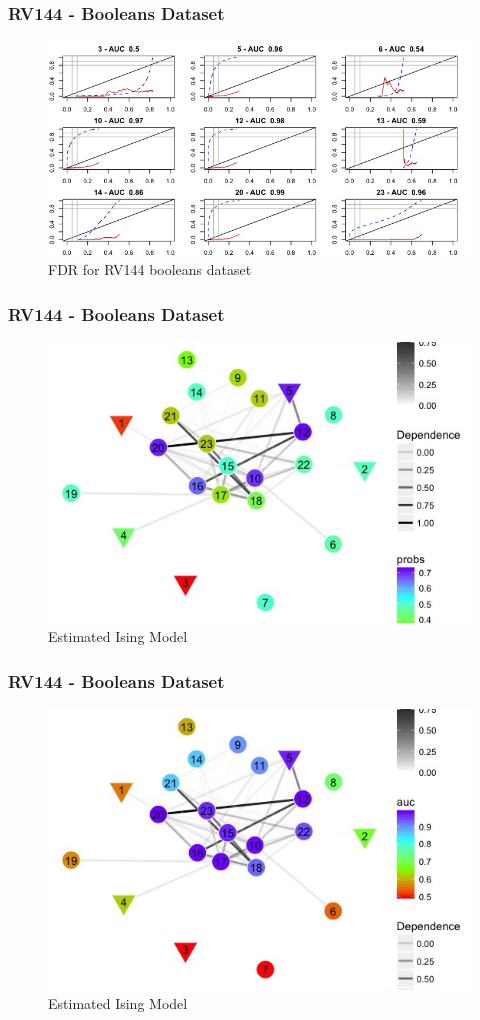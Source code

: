 \documentclass{beamer}
\theoremstyle{definition}
\begin{document}

\begin{frame}
\frametitle{RV144 - Booleans Dataset}
\begin{figure}[]
\includegraphics[width=12 cm]{figures/boolFDR} \caption{FDR for RV144 booleans dataset}
\end{figure}
\end{frame}


\begin{frame}
\frametitle{RV144 - Booleans Dataset}
\begin{figure}[]
\includegraphics[width=10 cm]{figures/boolNetworkProbs} \caption{Estimated Ising Model}
\end{figure}
\end{frame}


\begin{frame}
\frametitle{RV144 - Booleans Dataset}
\begin{figure}[]
\includegraphics[width=10 cm]{figures/boolNetworkAUC} \caption{Estimated Ising Model}
\end{figure}
\end{frame}
\end{document}
